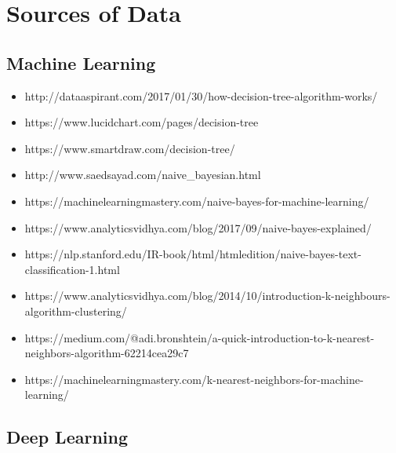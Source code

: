 \appendix
   
\section{Sources of Data}

\subsection{Machine Learning}
\begin{itemize}
\item http://dataaspirant.com/2017/01/30/how-decision-tree-algorithm-works/
\item https://www.lucidchart.com/pages/decision-tree
	
\item https://www.smartdraw.com/decision-tree/
	
\item http://www.saedsayad.com/naive\_bayesian.html
	
\item https://machinelearningmastery.com/naive-bayes-for-machine-learning/
	
\item https://www.analyticsvidhya.com/blog/2017/09/naive-bayes-explained/
	
\item https://nlp.stanford.edu/IR-book/html/htmledition/naive-bayes-text-classification-1.html
	
\item https://www.analyticsvidhya.com/blog/2014/10/introduction-k-neighbours-algorithm-clustering/
	
\item https://medium.com/@adi.bronshtein/a-quick-introduction-to-k-nearest-neighbors-algorithm-62214cea29c7
	
\item https://machinelearningmastery.com/k-nearest-neighbors-for-machine-learning/
	
\end{itemize}	


\subsection{Deep Learning}

